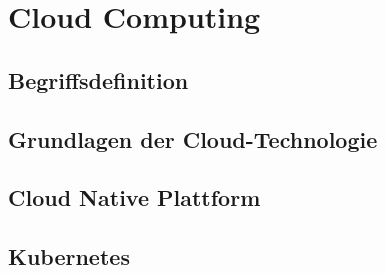 \newpage
\section{Cloud Computing}
\subsection{Begriffsdefinition}
\subsection{Grundlagen der Cloud-Technologie}
\subsection{Cloud Native Plattform}
\subsection{Kubernetes}